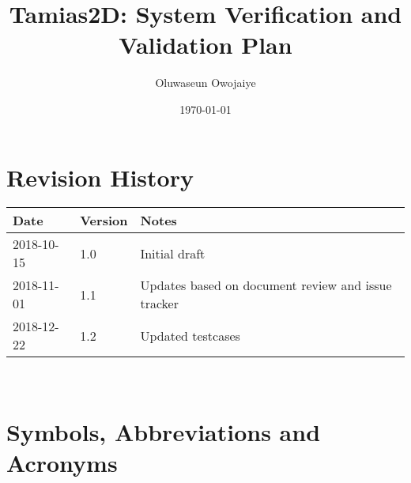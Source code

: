 \documentclass[12pt, titlepage]{article}
\newcommand{\progname}{Tamias2D}
\begin{document}
\title{\progname: System Verification and Validation Plan} 
\author{Oluwaseun Owojaiye}
\date{\today}
	
\maketitle


\section{Revision History}

\begin{tabularx}{\textwidth}{p{3cm}p{2cm}X}
\toprule {\bf Date} & {\bf Version} & {\bf Notes}\\
\midrule
2018-10-15 & 1.0 & Initial draft\\
2018-11-01 & 1.1 & Updates based on document review and issue tracker\\
2018-12-22 & 1.2 & Updated testcases\\
\bottomrule
\end{tabularx}

~\newpage

\section{Symbols, Abbreviations and Acronyms}
\renewcommand{\arraystretch}{1.2}
\end{document}
